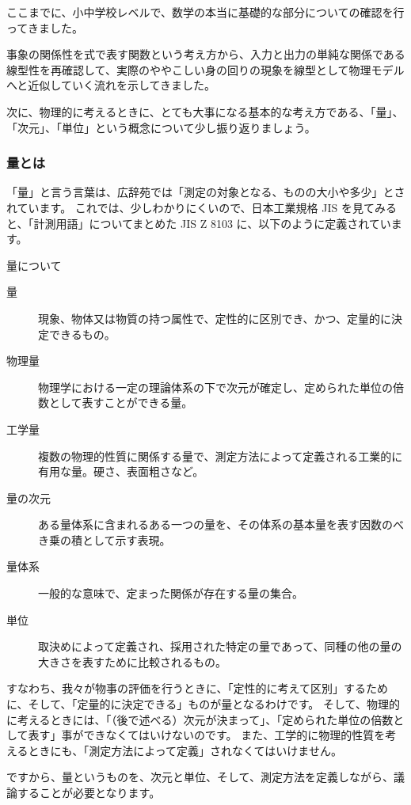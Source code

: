 \documentclass[uplatex,dvipdfmx,a4paper,11pt]{jsarticle}
\begin{document}
ここまでに、小中学校レベルで、数学の本当に基礎的な部分についての確認を行ってきました。

事象の関係性を式で表す関数という考え方から、入力と出力の単純な関係である線型性を再確認して、実際のややこしい身の回りの現象を線型として物理モデルへと近似していく流れを示してきました。

次に、物理的に考えるときに、とても大事になる基本的な考え方である、「量」、「次元」、「単位」という概念について少し振り返りましょう。


\subsubsection{量とは}
「量」と言う言葉は、広辞苑では「測定の対象となる、ものの大小や多少」とされています。
これでは、少しわかりにくいので、日本工業規格 JIS を見てみると、「計測用語」についてまとめた JIS Z 8103 に、以下のように定義されています。
\large
\begin{itembox}[l]{量について}
	\begin{description}
		\item[量] 現象、物体又は物質の持つ属性で、定性的に区別でき、かつ、定量的に決定できるもの。
		\item[物理量] 物理学における一定の理論体系の下で次元が確定し、定められた単位の倍数として表すことができる量。
		\item[工学量] 複数の物理的性質に関係する量で、測定方法によって定義される工業的に有用な量。硬さ、表面粗さなど。
		\item[量の次元] ある量体系に含まれるある一つの量を、その体系の基本量を表す因数のべき乗の積として示す表現。
		\item[量体系] 一般的な意味で、定まった関係が存在する量の集合。
		\item[単位] 取決めによって定義され、採用された特定の量であって、同種の他の量の大きさを表すために比較されるもの。
	\end{description}
\end{itembox}
\normalsize

すなわち、我々が物事の評価を行うときに、「定性的に考えて区別」するために、そして、「定量的に決定できる」ものが量となるわけです。
そして、物理的に考えるときには、「（後で述べる）次元が決まって」、「定められた単位の倍数として表す」事ができなくてはいけないのです。
また、工学的に物理的性質を考えるときにも、「測定方法によって定義」されなくてはいけません。

ですから、量というものを、次元と単位、そして、測定方法を定義しながら、議論することが必要となります。
\end{document}
